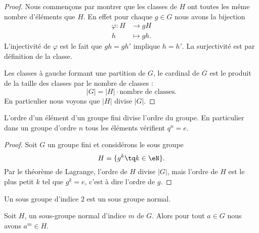 \begin{proof}
    Nous commençons par montrer que les classes de \( H\) ont toutes les même nombre d'éléments que \( H\). En effet pour chaque \( g\in G\) nous avons la bijection
    \begin{equation}
        \begin{aligned}
            \varphi\colon H&\to gH \\
            h&\mapsto gh. 
        \end{aligned}
    \end{equation}
    L'injectivité de \( \varphi\) est le fait que \( gh=gh'\) implique \( h=h'\). La surjectivité est par définition de la classe. 

    Les classes à gauche formant une partition de \( G\), le cardinal de \( G\) est le produit de la taille des classes par le nombre de classes :
    \begin{equation}
        | G |=| H |\cdot\text{nombre de classes}.
    \end{equation}
    En particulier nous voyons que \( | H |\) divise \( | G |\).
\end{proof}

\begin{corollary}       \label{CorpZItFX}
    L'ordre d'un élément d'un groupe fini divise l'ordre du groupe. En particulier dans un groupe d'ordre \( n\) tous les éléments vérifient \( q^n=e\).
\end{corollary}

\begin{proof}
    Soit \( G\) un groupe fini et considérons le sous groupe
    \begin{equation}
        H=\{ g^k\tq k\in\eN \}.
    \end{equation}
    Par le théorème de Lagrange, l'ordre de \( H\) divise \( | G |\), mais l'ordre de \( H\) est le plus petit \( k\) tel que \( g^k=e\), c'est à dire l'ordre de \( g\).
\end{proof}

\begin{lemma}    \label{LemSkIOOG}
    Un sous groupe d'indice \( 2\) est un sous groupe normal.
\end{lemma}

\begin{lemma}\label{PropubeiGX}
    Soit \( H\), un sous-groupe normal d'indice \( m\) de \( G\). Alors pour tout \( a\in G\) nous avons \( a^m\in H\).
\end{lemma}

